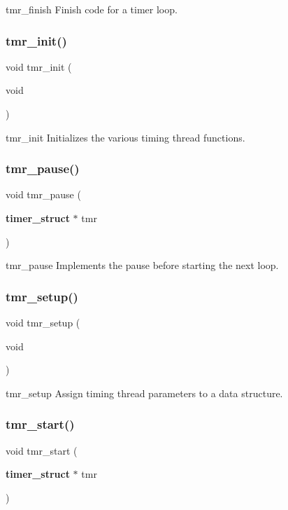 tmr\+\_\+finish Finish code for a timer loop. \mbox{\label{timer_8c_ab1c0b33865cecb5eb30e493aec037a62}} 
\subsubsection{tmr\+\_\+init()}
{\footnotesize\ttfamily void tmr\+\_\+init (\begin{DoxyParamCaption}\item[{void}]{ }\end{DoxyParamCaption})}

tmr\+\_\+init Initializes the various timing thread functions. \mbox{\label{timer_8c_a56d31db4da2f4e7665daf5385f17b491}} 
\subsubsection{tmr\+\_\+pause()}
{\footnotesize\ttfamily void tmr\+\_\+pause (\begin{DoxyParamCaption}\item[{\textbf{ timer\+\_\+struct} $\ast$}]{tmr }\end{DoxyParamCaption})}

tmr\+\_\+pause Implements the pause before starting the next loop. \mbox{\label{timer_8c_af70d423299ac4b60d7ea5e132ef64cf5}} 
\subsubsection{tmr\+\_\+setup()}
{\footnotesize\ttfamily void tmr\+\_\+setup (\begin{DoxyParamCaption}\item[{void}]{ }\end{DoxyParamCaption})}

tmr\+\_\+setup Assign timing thread parameters to a data structure. \mbox{\label{timer_8c_a4f4891597a529574d300197780997de7}} 
\subsubsection{tmr\+\_\+start()}
{\footnotesize\ttfamily void tmr\+\_\+start (\begin{DoxyParamCaption}\item[{\textbf{ timer\+\_\+struct} $\ast$}]{tmr }\end{DoxyParamCaption})}

